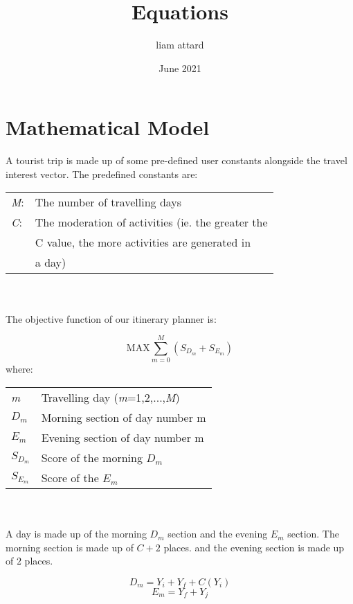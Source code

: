 \documentclass{article} \usepackage[utf8]{inputenc}
\title{Equations} \author{liam attard } \date{June 2021} \usepackage{amsmath}
\begin{document}
\maketitle


\section{Mathematical Model}


A tourist trip is made up of some pre-defined user constants alongside the
travel interest vector. The predefined constants are: \\
\setlength{\tabcolsep}{20pt}

\begin{tabular}{l l}

\textit{M}:  &  The number of travelling days \\ \textit{C}: & The moderation
of activities (ie. the greater the \\ & C value, the more activities are
generated in \\ & a day) \\  \end{tabular} \\ \\ The objective function of our
itinerary planner is:

\[ \text{MAX}  \sum_{m=0}^{M} ( S_{{D_m}} + S_{{E_m}}) \] where: \\
\begin{tabular}{l l}
\textit{m} & Travelling day (\textit{m}=1,2,...,\textit{M}) \\ \textit{$D_m$} &
Morning section of day number m \\  \textit{$E_m$} & Evening section of day
number m \\  \textit{$S_{D_m}$} & Score of the morning $D_m$ \\
\textit{$S_{E_m}$} & Score of the $E_m$ \\  \end{tabular} \\ \\ A day is made
up of the morning ${D_m}$ section and the evening ${E_m}$ section. The morning
section is made up of $C + 2$ places. and the evening section is made up of $2$
places. 

\[D_m = Y_i + Y_f + C ( Y_i) \] \[E_m = Y_f + Y_j \]
\end{document}

